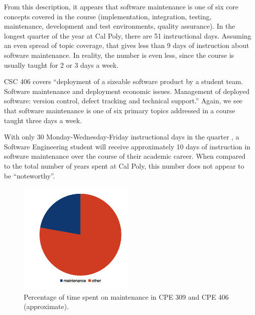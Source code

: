 \documentclass[11pt]{article}
\begin{document}
\begin{multicols}{2}
From this description, it appears that software maintenance is one of six core concepts covered in the course (implementation, integration, testing, maintenance, development and test environments, quality assurance).  In the longest quarter of the year at Cal Poly, there are 51 instructional days. \cite{polyCalendar}  Assuming an even spread of topic coverage, that gives less than 9 days of instruction about software maintenance.  In reality, the number is even less, since the course is usually taught for 2 or 3 days a week. \cite{309Schedule}

CSC 406 covers ``deployment of a sizeable software product by a student team. Software maintenance and deployment economic issues. Management of deployed  software: version control, defect tracking and technical support.'' \cite{catalogCourses}  Again, we see that software maintenance is one of six primary topics addressed in a course taught three days a week. \cite{406Schedule}

With only 30 Monday-Wednesday-Friday instructional days in the quarter \cite{polyCalendar}, a Software Engineering student will receive approximately 10 days of instruction in software maintenance over the course of their academic career.  When compared to the total number of years spent at Cal Poly, this number does not appear to be ``noteworthy''.

\begin{figure}[tbp!]
  \caption{Percentage of time spent on maintenance in CPE 309 and CPE 406 (approximate).}
  \centering
    \includegraphics[width=0.5\textwidth]{termpaper/images/pie-chart-01}
\end{figure}


\end{multicols}
\end{document}
